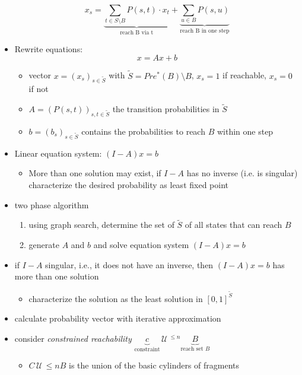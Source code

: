\documentclass[a4paper, 10pt]{article}
\newcommand{\until}{\,\mathcal{U}\,}
\newcommand{\underbraceset}[2]{\underset{#1}{\underbrace{#2}}}
\begin{document}
\begin{mdframed}
\begin{itemize}
    \[
    x_s = \underbraceset{\text{reach B via t}}{\sum_{t\in S\setminus B} P(s,t)\cdot x_t} + \underbraceset{\text{reach B in one step}}{\sum_{u\in B}P(s,u)}
    \]
    \item Rewrite equations: \[ x= Ax+b \]
    \begin{itemize}
        \item vector $x=(x_s)_{s\in\tilde{S}}$ with $\tilde{S}=Pre^*(B)\setminus B$, $x_s=1$ if reachable, $x_s=0$ if not
        \item $A=(P(s,t))_{s,t\in\tilde{S}}$  the transition probabilities in $\tilde{S}$
        \item $b=(b_s)_{s\in\tilde{S}}$ contains the probabilities to reach $B$ within one step
    \end{itemize}
    \item Linear equation system: $(I-A)x=b$
    \begin{itemize}
        \item More than one solution may exist, if $I-A$ has no inverse (i.e. is singular) \follows characterize the desired probability as least fixed point
    \end{itemize}
\end{itemize}
\begin{itemize}
    \item two phase algorithm
    \begin{enumerate}
        \item using graph search, determine the set of $\tilde{S}$ of all states that can reach $B$
        \item generate $A$ and $b$ and solve equation system $(I-A)x=b$
    \end{enumerate}
    \item if $I-A$ singular, i.e., it does not have an inverse, then $(I-A)x=b$ has more than one solution
    \begin{itemize}
        \item characterize the solution as the least solution in $[0,1]^{\tilde{S}}$
    \end{itemize}
    \item calculate probability vector with iterative approximation
    \item consider \emph{constrained reachability} $\underbraceset{\text{constraint}}{c}\until^{\leq n}\underbraceset{\text{reach set } B}{B}$
    \begin{itemize}
        \item $C\until\leq n B$ is the union of the basic cylinders of fragments

\end{itemize}
\end{itemize}
\end{mdframed}
\end{document}
